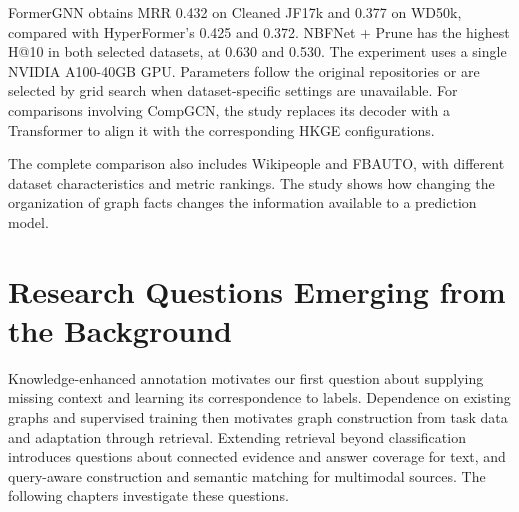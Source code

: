 FormerGNN obtains MRR 0.432 on Cleaned JF17k and 0.377 on WD50k, compared with HyperFormer's 0.425 and 0.372. NBFNet + Prune has the highest H@10 in both selected datasets, at 0.630 and 0.530. The experiment uses a single NVIDIA A100-40GB GPU. Parameters follow the original repositories or are selected by grid search when dataset-specific settings are unavailable. For comparisons involving CompGCN, the study replaces its decoder with a Transformer to align it with the corresponding HKGE configurations.

The complete comparison also includes Wikipeople and FBAUTO, with different dataset characteristics and metric rankings. The study shows how changing the organization of graph facts changes the information available to a prediction model.

\section{Research Questions Emerging from the Background}
\label{sec:background:questions}

Knowledge-enhanced annotation motivates our first question about supplying missing context and learning its correspondence to labels. Dependence on existing graphs and supervised training then motivates graph construction from task data and adaptation through retrieval. Extending retrieval beyond classification introduces questions about connected evidence and answer coverage for text, and query-aware construction and semantic matching for multimodal sources. The following chapters investigate these questions.
